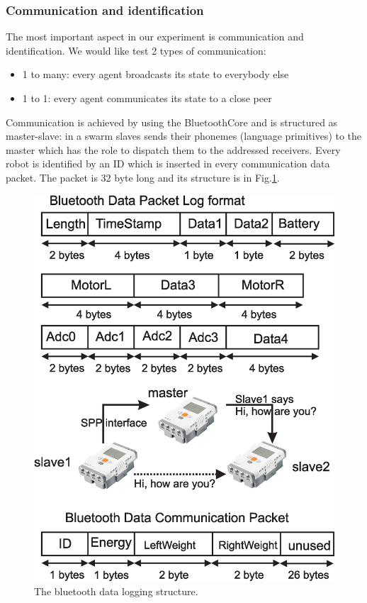 \subsubsection{Communication and identification}
The most important aspect in our experiment is communication and identification.
We would like test 2 types of communication:
\begin{itemize}
 \item 1 to many: every agent broadcasts its state to everybody else
 \item 1 to 1: every agent communicates its state to a close peer
\end{itemize}

Communication is achieved by using the BluetoothCore and is structured as master-slave:
in a swarm slaves sends their phonemes (language primitives) to the master which has the role to dispatch them to the addressed receivers.
Every robot is identified by an ID which is inserted in every communication data packet. The packet is 32 byte long and its structure is in Fig.\ref{blue:communication}.
\begin{figure}[htbp]
\begin{center}
\includegraphics[scale=0.4]{figures/nxtosek/bluetoothlog.eps}
\caption{The bluetooth data logging structure.\label{blue:communication}}
\end{center}
\end{figure}

